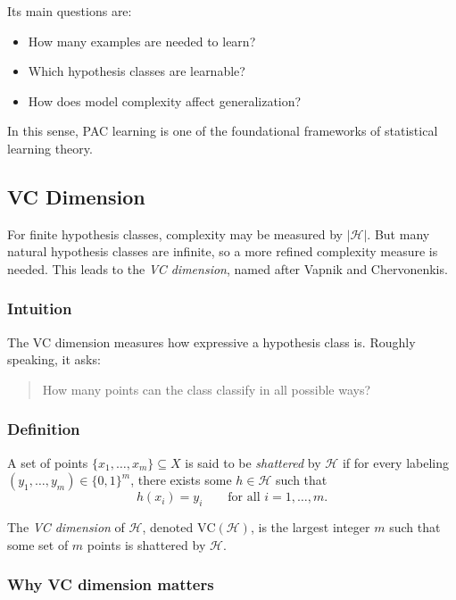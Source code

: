 Its main questions are:
\begin{itemize}
    \item How many examples are needed to learn?
    \item Which hypothesis classes are learnable?
    \item How does model complexity affect generalization?
\end{itemize}

In this sense, PAC learning is one of the foundational frameworks of statistical learning theory.

\subsection{VC Dimension}

For finite hypothesis classes, complexity may be measured by \(|\mathcal{H}|\). But many natural hypothesis classes are infinite, so a more refined complexity measure is needed. This leads to the \emph{VC dimension}, named after Vapnik and Chervonenkis.

\subsubsection{Intuition}

The VC dimension measures how expressive a hypothesis class is. Roughly speaking, it asks:

\begin{quote}
How many points can the class classify in all possible ways?
\end{quote}

\subsubsection{Definition}

A set of points \(\{x_1,\dots,x_m\}\subseteq X\) is said to be \emph{shattered} by \(\mathcal{H}\) if for every labeling \((y_1,\dots,y_m)\in\{0,1\}^m\), there exists some \(h\in\mathcal{H}\) such that
\[
h(x_i)=y_i
\qquad \text{for all } i=1,\dots,m.
\]

The \emph{VC dimension} of \(\mathcal{H}\), denoted \(\mathrm{VC}(\mathcal{H})\), is the largest integer \(m\) such that some set of \(m\) points is shattered by \(\mathcal{H}\).

\subsubsection{Why VC dimension matters}

